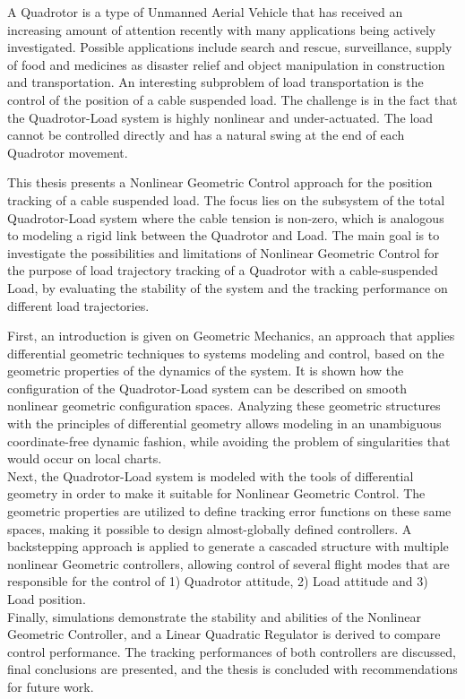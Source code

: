 \vspace{-2cm}
A Quadrotor is a type of Unmanned Aerial Vehicle that has received an increasing amount of attention recently with many applications being actively investigated. 
Possible applications include search and rescue, surveillance, supply of food and medicines as disaster relief and object manipulation in construction and transportation.
An interesting subproblem of load transportation is the control of the position of a cable suspended load. The challenge is in the fact that the Quadrotor-Load system is highly nonlinear and under-actuated. The load cannot be controlled directly and has a natural swing at the end of each Quadrotor movement. 

This thesis presents a Nonlinear Geometric Control approach for the position tracking of a cable suspended load. 
The focus lies on the subsystem of the total Quadrotor-Load system where the cable tension is non-zero, which is analogous to modeling a rigid link between the Quadrotor and Load.
The main goal is to investigate the possibilities and limitations of Nonlinear Geometric Control for the purpose of load trajectory tracking of a Quadrotor with a cable-suspended Load, by evaluating the stability of the system and the tracking performance on different load trajectories. 

First, an introduction is given on Geometric Mechanics, an approach that applies differential geometric techniques to systems modeling and control, based on the geometric properties of the dynamics of the system. 
It is shown how the configuration of the Quadrotor-Load system can be described on smooth nonlinear geometric configuration spaces. Analyzing these geometric structures with the principles of differential geometry allows modeling in an unambiguous coordinate-free dynamic fashion, while avoiding the problem of singularities that would occur on local charts. \\
Next, the Quadrotor-Load system is modeled with the tools of differential geometry in order to make it suitable for Nonlinear Geometric Control. The geometric properties are utilized to define tracking error functions on these same spaces, making it possible to design almost-globally defined controllers. A backstepping approach is applied to generate a cascaded structure with multiple nonlinear Geometric controllers, allowing control of several flight modes that are responsible for the control of 1) Quadrotor attitude, 2) Load attitude and 3) Load position.\\ 
Finally, simulations demonstrate the stability and abilities of the Nonlinear Geometric Controller, and a Linear Quadratic Regulator is derived to compare control performance. The tracking performances of both controllers are discussed, final conclusions are presented, and the thesis is concluded with recommendations for future work.
 

